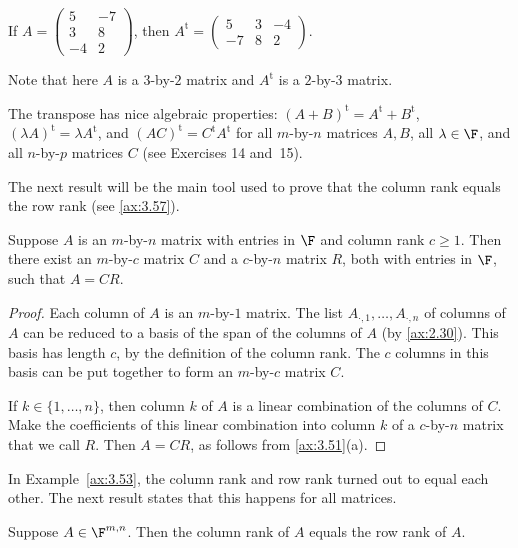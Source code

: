 \begin{example}\label{ax:3.55}
If $A=\begin{pmatrix} 5 & -7\\ 3 & 8\\ -4 & 2 \end{pmatrix}$, then
$A^{\mathrm{t}}=\begin{pmatrix} 5 & 3 & -4\\ -7 & 8 & 2 \end{pmatrix}$.

Note that here $A$ is a $3$-by-$2$ matrix and $A^{\mathrm{t}}$ is a
$2$-by-$3$ matrix.
\end{example}

The transpose has nice algebraic properties:
$(A+B)^{\mathrm{t}}=A^{\mathrm{t}}+B^{\mathrm{t}}$,
$(\lambda A)^{\mathrm{t}}=\lambda A^{\mathrm{t}}$, and
$(AC)^{\mathrm{t}}=C^{\mathrm{t}}A^{\mathrm{t}}$ for all $m$-by-$n$ matrices
$A,B$, all $\lambda\in\F$, and all $n$-by-$p$ matrices $C$ (see Exercises 14
and~15).

The next result will be the main tool used to prove that the column rank equals
the row rank (see \ref{ax:3.57}).

\begin{result}\label{ax:3.56}
Suppose $A$ is an $m$-by-$n$ matrix with entries in $\F$ and column rank
$c\ge1$. Then there exist an $m$-by-$c$ matrix $C$ and a $c$-by-$n$ matrix $R$,
both with entries in $\F$, such that $A=CR$.
\end{result}

\begin{proof}
Each column of $A$ is an $m$-by-$1$ matrix. The list
$A_{\cdot,1},\dots,A_{\cdot,n}$ of columns of $A$ can be reduced to a basis of
the span of the columns of $A$ (by \ref{ax:2.30}). This basis has length $c$,
by the definition of the column rank. The $c$ columns in this basis can be put
together to form an $m$-by-$c$ matrix $C$.

If $k\in\{1,\dots,n\}$, then column $k$ of $A$ is a linear combination of the
columns of $C$. Make the coefficients of this linear combination into column
$k$ of a $c$-by-$n$ matrix that we call $R$. Then $A=CR$, as follows from
\ref{ax:3.51}(a).
\end{proof}

In Example~\ref{ax:3.53}, the column rank and row rank turned out to equal each
other. The next result states that this happens for all matrices.

\begin{result}\label{ax:3.57}
Suppose $A\in\F^{m,n}$. Then the column rank of $A$ equals the row rank of $A$.
\end{result}

